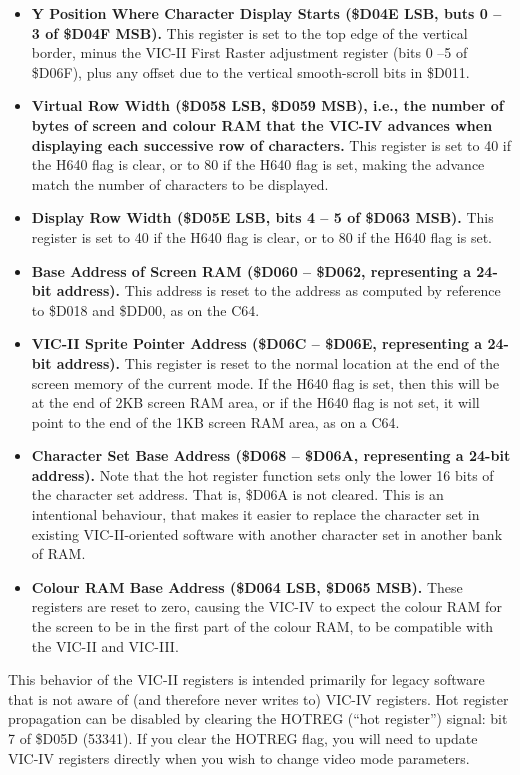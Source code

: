 \begin{itemize}
\item {\bf Y Position Where Character Display Starts (\$D04E LSB, buts 0 -- 3 of \$D04F MSB).}  This register is set to the top edge of the vertical border, minus the VIC-II First Raster adjustment register (bits 0 --5 of \$D06F), plus any offset due to the vertical smooth-scroll bits in \$D011.
\item {\bf Virtual Row Width (\$D058 LSB, \$D059 MSB), i.e., the number of bytes of screen and colour RAM that the VIC-IV advances when displaying each successive row of characters.} This register is set to 40 if the H640 flag is clear, or to 80 if the H640 flag is set, making the advance match the number of characters to be displayed.
\item {\bf Display Row Width (\$D05E LSB, bits 4 -- 5 of \$D063 MSB).} This register is set to 40 if the H640 flag is clear, or to 80 if the H640 flag is set.
\item {\bf Base Address of Screen RAM (\$D060 -- \$D062, representing a 24-bit address).}  This address is reset to the address as computed by reference to \$D018 and \$DD00, as on the C64.
\item {\bf VIC-II Sprite Pointer Address (\$D06C -- \$D06E, representing a 24-bit address).} This register is reset to the normal location at the end of the screen memory of the current mode.  If the H640 flag is set, then this will be at the end of 2KB screen RAM area, or if the H640 flag is not set, it will point to the end of the 1KB screen RAM area, as on a C64.
\item {\bf Character Set Base Address (\$D068 -- \$D06A, representing a 24-bit address).}  Note that the hot register function sets only the lower 16 bits of the character set address. That is, \$D06A is not cleared. This is an intentional behaviour, that makes it easier to replace the character set in existing VIC-II-oriented software with another character set in another bank of RAM.
\item {\bf Colour RAM Base Address (\$D064 LSB, \$D065 MSB).} These registers are reset to zero, causing the VIC-IV to expect the colour RAM for the screen to be in the first part of the colour RAM, to be compatible with the VIC-II and VIC-III.
\end{itemize}

This behavior of the VIC-II registers is intended primarily for legacy software that is not aware of (and therefore never writes to) VIC-IV registers. Hot register propagation can be disabled by clearing the HOTREG (``hot register'') signal: bit 7 of \$D05D (53341). If you clear the HOTREG flag, you will need to update VIC-IV registers directly when you wish to change video mode parameters.

